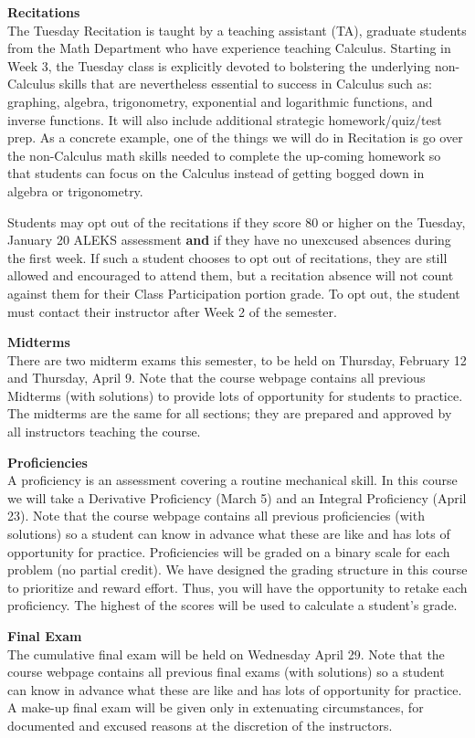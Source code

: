 \documentclass[12pt]{article}
\renewcommand{\emph}[1]{\textsf{\textbf{#1}}}
\newcommand{\localhead}[1]{\par\smallskip\textbf{#1}\nobreak\\}%
\def\heading#1{\localhead{\large\emph{#1}}}
\begin{document}
\heading{Recitations}
The Tuesday Recitation is taught by a teaching assistant (TA), graduate students from the Math  Department who have experience teaching Calculus. Starting in Week 3, the Tuesday class is explicitly devoted to bolstering the underlying non-Calculus skills that are nevertheless essential to success in Calculus such as: graphing, algebra, trigonometry, exponential and logarithmic functions, and inverse functions. It will also include additional strategic homework/quiz/test prep. As a concrete example, one of the things we will do in Recitation is go over the non-Calculus math skills needed to complete the up-coming homework so that students can focus on the Calculus instead of getting bogged down in algebra or trigonometry.

Students may opt out of the recitations if they score 80 or higher on the Tuesday, {January 20} ALEKS assessment \textbf{and} if they have no unexcused absences during the first week. If such a student chooses to opt out of recitations, they are still allowed and encouraged to attend them, but a recitation absence will not count against them for their Class Participation portion grade. To opt out, the student must contact their instructor after Week 2 of the semester.

\heading{Midterms}
There are two midterm exams this semester, to be held on Thursday, February 12 and Thursday, April 9. Note that the course webpage contains all previous Midterms (with solutions) to provide lots of opportunity for students to practice. The midterms are the same for all sections; they are prepared and approved by all instructors teaching the course. 

\heading{Proficiencies}
A proficiency is an assessment covering a routine mechanical skill.  In this course we will take a Derivative Proficiency (March 5) and an Integral Proficiency (April 23). Note that the course webpage contains all previous proficiencies (with solutions) so a student can know in advance what these are like and has lots of opportunity for practice. Proficiencies will be graded on a binary scale for each problem (no partial credit). We have designed the grading structure in this course to prioritize and reward effort. Thus, you will have the opportunity to retake each proficiency. The highest of the scores will be used to calculate a student's grade.


\heading{Final Exam} 
The cumulative final exam will be held on Wednesday April 29. Note that the course webpage contains all previous final exams (with solutions) so a student can know in advance what these are like  and has lots of opportunity for practice. A make-up final exam will be given only in extenuating circumstances, for documented and excused reasons at the discretion of the instructors.
\end{document}
